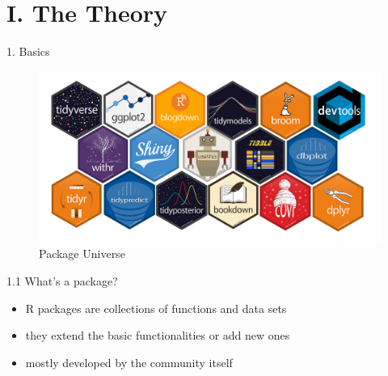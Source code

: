 \documentclass[11pt,a4paper]{beamer}
\begin{document}
\section{I. The Theory}


\begin{frame}[t]{1. Basics}
	

\begin{figure}
	\centering
	\includegraphics[width=0.9\linewidth]{packages}
	\caption{Package Universe}
\end{figure}

	
\end{frame}










		\begin{frame}[t]{1.1 What's a package?}
				
		\begin{itemize}
			\item R packages are collections of functions and data sets  
			\item they extend the basic functionalities or add new ones
			\item mostly developed by the community itself 
			
			
		\end{itemize}
		
	\end{frame}
	
	
\end{document}
